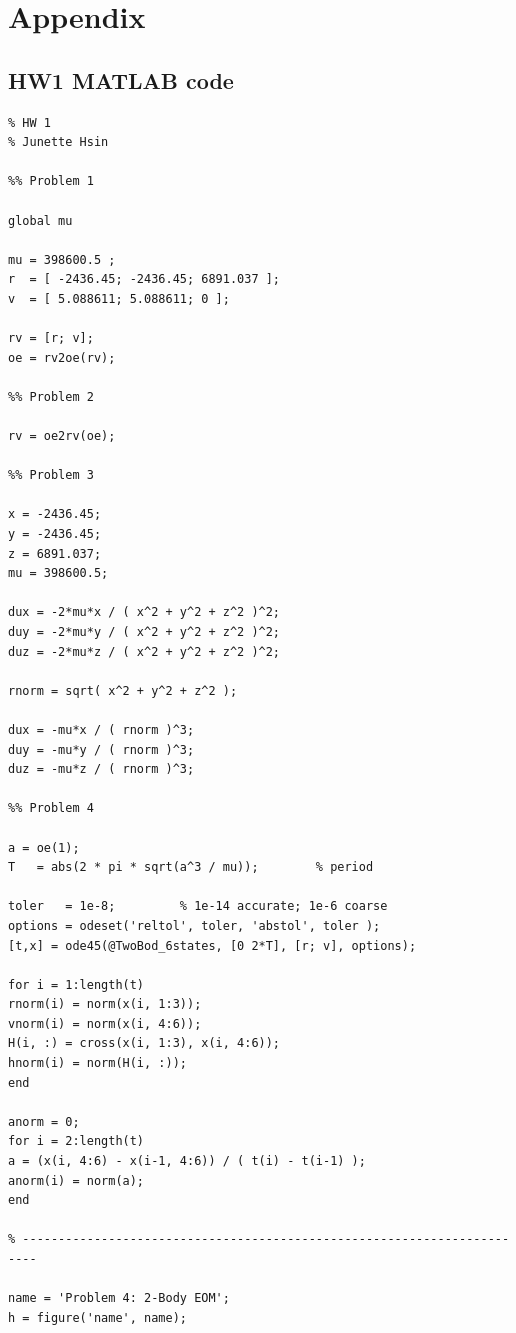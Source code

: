 \documentclass[conf]{new-aiaa}
\begin{document}

\newpage
\section*{Appendix} 

\subsection*{HW1 MATLAB code} 

\begin{lstlisting}[basicstyle=\footnotesize]
% ASE 389 Orbit Determination
% HW 1
% Junette Hsin 

%% Problem 1 

global mu 

mu = 398600.5 ; 
r  = [ -2436.45; -2436.45; 6891.037 ]; 
v  = [ 5.088611; 5.088611; 0 ]; 

rv = [r; v]; 
oe = rv2oe(rv);  

%% Problem 2 

rv = oe2rv(oe); 

%% Problem 3 

x = -2436.45; 
y = -2436.45; 
z = 6891.037; 
mu = 398600.5; 

dux = -2*mu*x / ( x^2 + y^2 + z^2 )^2; 
duy = -2*mu*y / ( x^2 + y^2 + z^2 )^2;
duz = -2*mu*z / ( x^2 + y^2 + z^2 )^2;

rnorm = sqrt( x^2 + y^2 + z^2 ); 

dux = -mu*x / ( rnorm )^3; 
duy = -mu*y / ( rnorm )^3; 
duz = -mu*z / ( rnorm )^3;

%% Problem 4 

a = oe(1); 
T   = abs(2 * pi * sqrt(a^3 / mu));        % period 

toler   = 1e-8;         % 1e-14 accurate; 1e-6 coarse 
options = odeset('reltol', toler, 'abstol', toler ); 
[t,x] = ode45(@TwoBod_6states, [0 2*T], [r; v], options); 

for i = 1:length(t)
rnorm(i) = norm(x(i, 1:3)); 
vnorm(i) = norm(x(i, 4:6)); 
H(i, :) = cross(x(i, 1:3), x(i, 4:6)); 
hnorm(i) = norm(H(i, :)); 
end 

anorm = 0; 
for i = 2:length(t)
a = (x(i, 4:6) - x(i-1, 4:6)) / ( t(i) - t(i-1) ); 
anorm(i) = norm(a); 
end 

% ------------------------------------------------------------------------

name = 'Problem 4: 2-Body EOM'; 
h = figure('name', name); 


\end{lstlisting}
\end{document}
